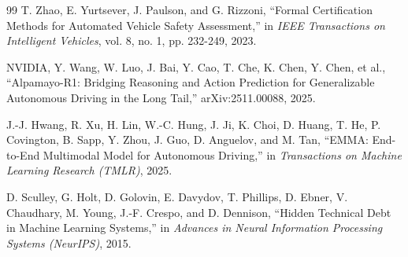 \documentclass[11pt]{article}
\begin{document}
\begin{thebibliography}{99}
T. Zhao, E. Yurtsever, J. Paulson, and G. Rizzoni,
``Formal Certification Methods for Automated Vehicle Safety Assessment,''
in \textit{IEEE Transactions on Intelligent Vehicles}, vol. 8, no. 1, pp. 232-249, 2023.

NVIDIA, Y. Wang, W. Luo, J. Bai, Y. Cao, T. Che, K. Chen, Y. Chen, et al.,
``Alpamayo-R1: Bridging Reasoning and Action Prediction for Generalizable Autonomous Driving in the Long Tail,''
arXiv:2511.00088, 2025.

J.-J. Hwang, R. Xu, H. Lin, W.-C. Hung, J. Ji, K. Choi, D. Huang, T. He, P. Covington, B. Sapp, Y. Zhou, J. Guo, D. Anguelov, and M. Tan,
``EMMA: End-to-End Multimodal Model for Autonomous Driving,''
in \textit{Transactions on Machine Learning Research (TMLR)}, 2025.

D. Sculley, G. Holt, D. Golovin, E. Davydov, T. Phillips, D. Ebner, V. Chaudhary, M. Young, J.-F. Crespo, and D. Dennison,
``Hidden Technical Debt in Machine Learning Systems,''
in \textit{Advances in Neural Information Processing Systems (NeurIPS)}, 2015.

\end{thebibliography}
\end{document}

